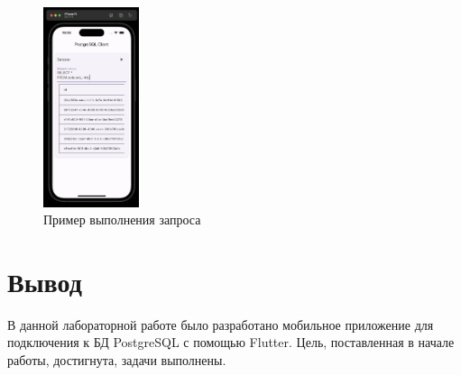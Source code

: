 \documentclass[a4paper, 14pt]{extarticle}
\begin{document}
\begin{figure}[H]
  \centering
  \includegraphics[width=0.25\textwidth]{images/task-2/4.png}
  \caption{Пример выполнения запроса}
  \label{fig:task-2-4}
\end{figure}

\section{Вывод}

В данной лабораторной работе было разработано мобильное приложение для
подключения к БД \foreignlanguage{english}{PostgreSQL} с помощью
\foreignlanguage{english}{Flutter}. Цель, поставленная в начале работы,
достигнута, задачи выполнены.
\end{document}

